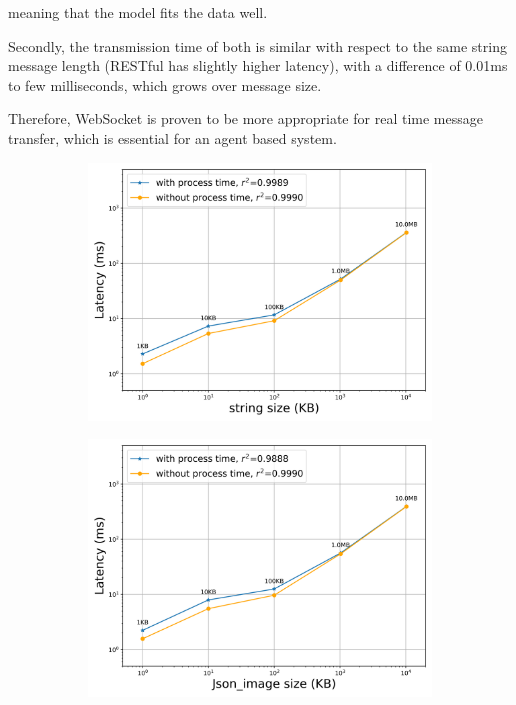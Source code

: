 meaning that the model fits the data well.





Secondly, the transmission time of both is similar 
with respect to the same string message length (RESTful has slightly higher latency), 
with a difference of 0.01ms to few milliseconds, which grows over 
message size.   

Therefore, WebSocket is proven to be more appropriate for real time message 
transfer, which is essential for an agent based system.


\begin{figure}[htb]
    \begin{subfigure}[b]{0.49\textwidth}
        \centering
        \includegraphics[width=\textwidth]{figures/tests/proportional_tests/Rest_log_Average_string_messages_sending_time_of_100_tests.png}\hfill 
        \caption{} \label{fig: proportional-rest-stringsize-c}
    \end{subfigure}
    \begin{subfigure}[b]{0.49\textwidth}
        \centering
        \includegraphics[width=\textwidth]{figures/tests/proportional_tests/Rest_log_Average_string_messages_receiving_time_of_100_tests.png}\hfill 
        \caption{} \label{fig: proportional-rest-stringsize-d}
    \end{subfigure}


\end{figure}
